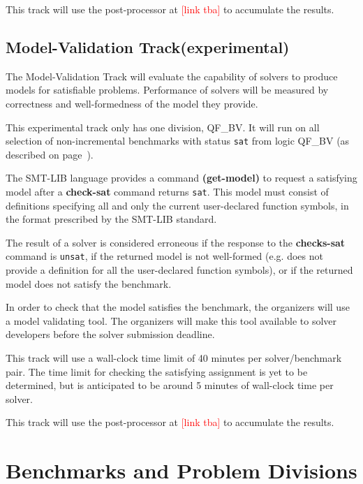 \documentclass[12pt]{article}
\newcommand{\akey}[1]{\textbf{#1}\xspace}
\newcommand{\rem}[1]{\textcolor{red}{[#1]}}
\newcommand{\mvaltrack}{Model-Validation Track\xspace}
\begin{document}
This track will use the post-processor at \rem{link tba} to accumulate the
results.

\subsection{\mvaltrack (experimental)}
\label{sec:exec:model}
The \mvaltrack will evaluate the capability of solvers to produce models for
satisfiable problems.  Performance of solvers will be measured by correctness
and well-formedness of the model they provide.

This experimental track only has one division, QF\_BV. It will run on all
selection of non-incremental benchmarks with status \texttt{sat} from logic
QF\_BV (as described on page~\pageref{benchmark-selection}).

The SMT-LIB language provides a command \akey{(get-model)} to request a
satisfying model after a \akey{check-sat} command returns \texttt{sat}.  This
model must consist of definitions specifying all and only the current
user-declared function symbols, in the format prescribed by the SMT-LIB
standard.

The result of a solver is considered erroneous if the response to the
\akey{checks-sat} command is \texttt{unsat}, if the returned model is not
well-formed (e.g. does not provide a definition for all the user-declared
function symbols), or if the returned model does not satisfy the benchmark.

In order to check that the model satisfies the benchmark, the organizers will
use a model validating tool. The organizers will make this tool available to
solver developers before the solver submission deadline.

This track will use a wall-clock time limit of 40 minutes per solver/benchmark
pair. The time limit for checking the satisfying assignment is yet to be
determined, but is anticipated to be around 5 minutes of wall-clock time per
solver.

This track will use the post-processor at \rem{link tba} to accumulate the
results.


\section{Benchmarks and Problem Divisions}
\end{document}
